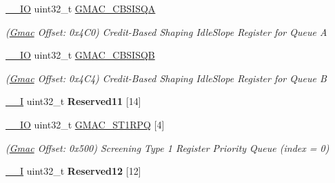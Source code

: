 \begin{DoxyCompactItemize}
\mbox{\label{structGmac_a34116bf07e369f1c6c8d7a015e890b50}} 
\mbox{\hyperlink{core__cm7_8h_aec43007d9998a0a0e01faede4133d6be}{\+\_\+\+\_\+\+IO}} uint32\+\_\+t \mbox{\hyperlink{structGmac_a34116bf07e369f1c6c8d7a015e890b50}{G\+M\+A\+C\+\_\+\+C\+B\+S\+I\+S\+QA}}
\begin{DoxyCompactList}\small\item\em (\mbox{\hyperlink{structGmac}{Gmac}} Offset\+: 0x4\+C0) Credit-\/\+Based Shaping Idle\+Slope Register for Queue A \end{DoxyCompactList}\item 
\mbox{\label{structGmac_aaf095c757654bd933603a6a33f57d327}} 
\mbox{\hyperlink{core__cm7_8h_aec43007d9998a0a0e01faede4133d6be}{\+\_\+\+\_\+\+IO}} uint32\+\_\+t \mbox{\hyperlink{structGmac_aaf095c757654bd933603a6a33f57d327}{G\+M\+A\+C\+\_\+\+C\+B\+S\+I\+S\+QB}}
\begin{DoxyCompactList}\small\item\em (\mbox{\hyperlink{structGmac}{Gmac}} Offset\+: 0x4\+C4) Credit-\/\+Based Shaping Idle\+Slope Register for Queue B \end{DoxyCompactList}\item 
\mbox{\label{structGmac_abaf96de85755af6e0ecfe3b78e273140}} 
\mbox{\hyperlink{core__cm7_8h_af63697ed9952cc71e1225efe205f6cd3}{\+\_\+\+\_\+I}} uint32\+\_\+t {\bfseries Reserved11} \mbox{[}14\mbox{]}
\item 
\mbox{\label{structGmac_a8e69bf0bd15efbe9207513553f229319}} 
\mbox{\hyperlink{core__cm7_8h_aec43007d9998a0a0e01faede4133d6be}{\+\_\+\+\_\+\+IO}} uint32\+\_\+t \mbox{\hyperlink{structGmac_a8e69bf0bd15efbe9207513553f229319}{G\+M\+A\+C\+\_\+\+S\+T1\+R\+PQ}} \mbox{[}4\mbox{]}
\begin{DoxyCompactList}\small\item\em (\mbox{\hyperlink{structGmac}{Gmac}} Offset\+: 0x500) Screening Type 1 Register Priority Queue (index = 0) \end{DoxyCompactList}\item 
\mbox{\label{structGmac_a734f5cabde77ae52214bc90d071b856e}} 
\mbox{\hyperlink{core__cm7_8h_af63697ed9952cc71e1225efe205f6cd3}{\+\_\+\+\_\+I}} uint32\+\_\+t {\bfseries Reserved12} \mbox{[}12\mbox{]}
\item 
\mbox{\label{structGmac_accb0bb12cfd6251eb2f91c8fb24618fc}} 

\end{DoxyCompactItemize}
